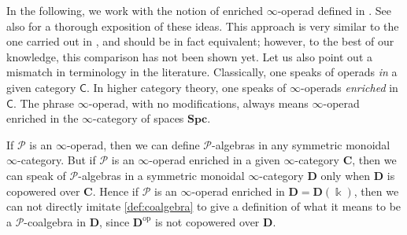 \documentclass[a4paper,12pt]{amsart}
\theoremstyle{plain}
\theoremstyle{definition}
\theoremstyle{remark}
\newcommand{\kk}{\Bbbk}
\begin{document}
 In the following, we work with the notion of enriched $\infty$-operad defined in \cite[Section 4.1.2]{BrantnerPhD}. See also \cite[Section 5.2.4]{ShiPhD} for a thorough exposition of these ideas. This approach is very similar to the one carried out in \cite{Haugseng}, and should be in fact equivalent; however, to the best of our knowledge, this comparison has not been shown yet. Let us also point out a mismatch in terminology in the literature. Classically, one speaks of operads \emph{in} a given category $\mathsf C$. In higher category theory, one speaks of $\infty$-operads \emph{enriched} in $\mathsf C$. The phrase $\infty$-operad, with no modifications, always means $\infty$-operad enriched in the $\infty$-category of spaces $\mathbf {Spc}$.

If $\mathscr P$ is an $\infty$-operad, then we can define $\mathscr P$-algebras in any symmetric monoidal $\infty$-category. But if $\mathscr P$ is an $\infty$-operad enriched in a given $\infty$-category $\mathbf C$, then we can speak of $\mathscr P$-algebras in a symmetric monoidal $\infty$-category $\mathbf D$ only when $\mathbf D$ is copowered over $\mathbf C$. Hence if $\mathscr P$ is an $\infty$-operad enriched in $\mathbf D = \mathbf D(\kk)$, then we can not directly imitate \cref{def:coalgebra} to give a definition of what it means to be a $\mathscr P$-coalgebra in $\mathbf D$, since $\mathbf D^{\mathrm{op}}$ is not copowered over $\mathbf D$. 
\end{document}
